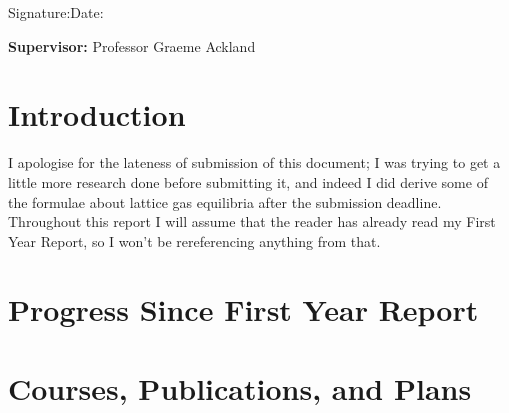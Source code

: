 \documentclass[a4paper,12pt]{article}
\begin{document}
\vspace*{1cm}

\vspace*{3cm}
Signature:\hspace*{8cm}Date:

\vfill
{\bf Supervisor:} Professor Graeme Ackland                %
\newpage
\setcounter{page}{1}                            %
\footruleheight{1pt}
\headruleheight{1pt}
\rhead{\thepage}
\cfoot{}
%
\tableofcontents  %

\section{Introduction}

I apologise for the lateness of submission of this document; I was trying to get a little more research done before submitting it, and indeed I did derive some of the formulae about lattice gas equilibria
after the submission deadline. Throughout this report I will assume that the reader has already read my First Year Report, so I won't be rereferencing anything from that.

\section{Progress Since First Year Report}


\section{Courses, Publications, and Plans}



%
%

 



\end{document}
